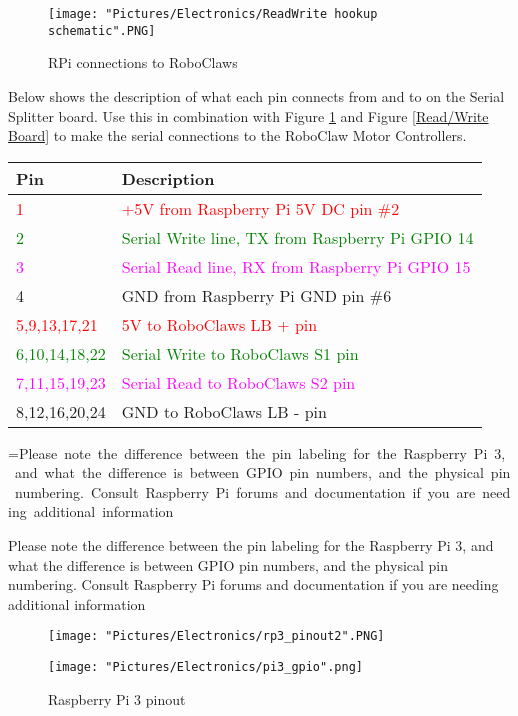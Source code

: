 \documentclass[12pt]{article}
\makeatletter
\newcommand{\mybox}[1]{%
  \setbox0=\hbox{#1}%
  \setlength{\@tempdima}{\dimexpr\wd0+13pt}%
  \begin{tcolorbox}[colframe=mycolor,boxrule=0.5pt,arc=4pt,
      left=6pt,right=6pt,top=6pt,bottom=6pt,boxsep=0pt,width=0.95\textwidth]
    #1
  \end{tcolorbox}
}
\makeatother
\begin{document}
\begin{figure}[H]
 	\centering
	\texttt{[image: "Pictures/Electronics/ReadWrite hookup schematic".PNG]}
 	\caption{RPi connections to RoboClaws}
	\label{rpi to rc}
\end{figure}


Below shows the description of what each pin connects from and to on the Serial Splitter board. Use this in combination with Figure \ref{rpi to rc} and Figure \ref{Read/Write Board} to make the serial connections to the RoboClaw Motor Controllers. 

\bigskip

\begin{tabular}[2] {| p{2.5cm} | p{11cm} |}
	\hline
	\textbf{Pin} & \textbf{Description} \\ \hline
	\textcolor{red}{1} & \textcolor{red}{+5V from Raspberry Pi 5V DC pin \#2} \\ \hline
	\textcolor{green}{2} & \textcolor{green}{Serial Write line, TX from Raspberry Pi GPIO 14} \\ \hline
	\textcolor{magenta}{3} & \textcolor{magenta}{Serial Read line, RX from Raspberry Pi GPIO 15}	\\ \hline
	4 & GND from Raspberry Pi GND pin \#6 \\ \hline
	\textcolor{red}{5,9,13,17,21} & \textcolor{red}{5V to RoboClaws LB + pin} \\ \hline
	\textcolor{green}{6,10,14,18,22} & \textcolor{green}{Serial Write to RoboClaws S1 pin} \\ \hline
	\textcolor{magenta}{7,11,15,19,23} & \textcolor{magenta}{Serial Read to RoboClaws S2 pin} \\ \hline
	8,12,16,20,24 & GND to RoboClaws LB - pin \\ \hline 
\end{tabular}

\bigskip 

\mybox{Please note the difference between the pin labeling for the Raspberry Pi 3, and what the difference is between GPIO pin numbers, and the physical pin numbering. Consult Raspberry Pi forums and documentation if you are needing additional information}


\begin{figure}[H]
 	\centering
  	\begin{minipage}[b]{0.35\textwidth}
		\texttt{[image: "Pictures/Electronics/rp3\_pinout2".PNG]}
  	\end{minipage}
  	\hfill
  	\begin{minipage}[b]{0.45\textwidth}
    		\texttt{[image: "Pictures/Electronics/pi3\_gpio".png]}
  	\end{minipage}
	\caption{Raspberry Pi 3 pinout}
	\label{RPi 3 pinout}
\end{figure}
\end{document}
